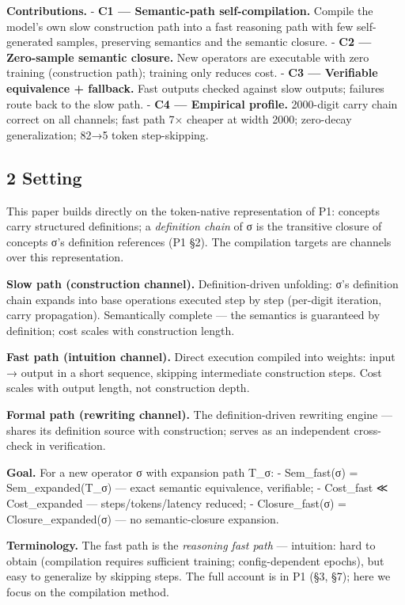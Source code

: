 \documentclass[
]{article}
\begin{document}
\textbf{Contributions.} - \textbf{C1 --- Semantic-path
self-compilation.} Compile the model's own slow construction path into a
fast reasoning path with few self-generated samples, preserving
semantics and the semantic closure. - \textbf{C2 --- Zero-sample
semantic closure.} New operators are executable with zero training
(construction path); training only reduces cost. - \textbf{C3 ---
Verifiable equivalence + fallback.} Fast outputs checked against slow
outputs; failures route back to the slow path. - \textbf{C4 ---
Empirical profile.} 2000-digit carry chain correct on all channels; fast
path 7× cheaper at width 2000; zero-decay generalization; 82→5 token
step-skipping.

\subsection{2 Setting}\label{setting}

This paper builds directly on the token-native representation of P1:
concepts carry structured definitions; a \emph{definition chain} of σ is
the transitive closure of concepts σ's definition references (P1 §2).
The compilation targets are channels over this representation.

\textbf{Slow path (construction channel).} Definition-driven unfolding:
σ's definition chain expands into base operations executed step by step
(per-digit iteration, carry propagation). Semantically complete --- the
semantics is guaranteed by definition; cost scales with construction
length.

\textbf{Fast path (intuition channel).} Direct execution compiled into
weights: input → output in a short sequence, skipping intermediate
construction steps. Cost scales with output length, not construction
depth.

\textbf{Formal path (rewriting channel).} The definition-driven
rewriting engine --- shares its definition source with construction;
serves as an independent cross-check in verification.

\textbf{Goal.} For a new operator σ with expansion path T\_σ: -
Sem\_fast(σ) = Sem\_expanded(T\_σ) --- exact semantic equivalence,
verifiable; - Cost\_fast ≪ Cost\_expanded --- steps/tokens/latency
reduced; - Closure\_fast(σ) = Closure\_expanded(σ) --- no
semantic-closure expansion.

\textbf{Terminology.} The fast path is the \emph{reasoning fast path}
--- intuition: hard to obtain (compilation requires sufficient training;
config-dependent epochs), but easy to generalize by skipping steps. The
full account is in P1 (§3, §7); here we focus on the compilation method.
\end{document}
